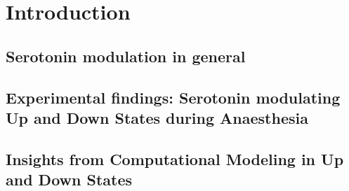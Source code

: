 \chapter{Introduction\label{cha:introduction}}
\section{Serotonin modulation in general}
\noindent
\indent

\section{Experimental findings: Serotonin modulating Up and Down States during Anaesthesia}
\noindent
\indent 

\section{Insights from Computational Modeling in Up and Down States}
\noindent      
\indent